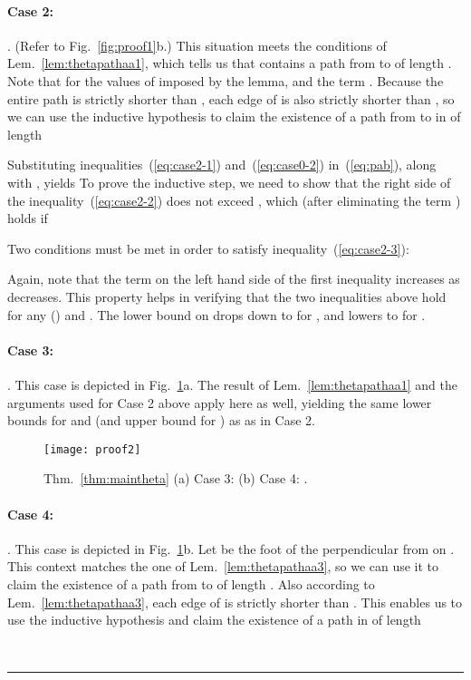 \documentclass[11pt]{article}
\newcommand{\qed}{\rule{0.5em}{1.5ex}}
\newcommand{\fqed}{{\hfill~\qed}}
\newenvironment{proof}{{\noindent \bf Proof.}}
                      {{\hfill \fqed} \vspace{1em}}
\begin{document}
\begin{proof}
\paragraph{Case 2:} . (Refer to Fig.~\ref{fig:proof1}b.) This situation meets the conditions of Lem.~\ref{lem:thetapathaa1}, which tells us that  contains a path  from  to  of length . Note that for the values of  imposed by the lemma,  and the term . Because the entire path  is strictly shorter than , each edge of  is also strictly shorter than , so we can use the inductive hypothesis to claim the existence of a path  from  to  in  of length

Substituting inequalities~(\ref{eq:case2-1}) and~(\ref{eq:case0-2}) in~(\ref{eq:pab}), along with ,  yields 
To prove the inductive step, we need to show that the right side of the inequality~(\ref{eq:case2-2}) does not exceed , which (after eliminating the term ) holds if

Two conditions must be met in order to satisfy inequality~(\ref{eq:case2-3}):

Again, note that the term on the left hand side of the first inequality increases as  decreases. This property helps in verifying that the two inequalities above hold for any  () and . The lower bound on  drops down to  for , and lowers to  for .

\paragraph{Case 3:} . This case is depicted in Fig.~\ref{fig:proof2}a. The result of  Lem.~\ref{lem:thetapathaa1} and the arguments used for Case 2 above apply here as well, yielding the same lower bounds for  and  (and upper bound for ) as as in Case 2.

\begin{figure}[htpb]
\centering
\texttt{[image: proof2]}
\caption{Thm.~\ref{thm:maintheta} (a) Case 3:  (b) Case 4: .}
\label{fig:proof2}
\end{figure}


\paragraph{Case 4:} . This case is depicted in Fig.~\ref{fig:proof2}b.
Let  be the foot of the perpendicular from  on . This context matches the one of Lem.~\ref{lem:thetapathaa3}, so we can use it to claim the existence of a path  from  to  of length . Also according to Lem.~\ref{lem:thetapathaa3}, each edge of  is strictly shorter than . This enables us to use the inductive hypothesis and claim the existence of a path  in  of length


\end{proof}
\end{document}
